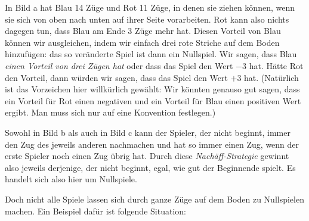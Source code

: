 \documentclass{zusammenfassung}
\begin{document}
\begin{aufgabe}
\begin{center}
  \end{center}
\end{aufgabe}

In Bild a hat Blau 14 Züge und Rot 11 Züge, in denen sie ziehen können, wenn sie sich von oben nach unten auf ihrer Seite
vorarbeiten. Rot kann also nichts dagegen tun, dass Blau am Ende 3 Züge mehr hat. Diesen Vorteil von Blau können wir ausgleichen,
indem wir einfach drei rote Striche auf dem Boden hinzufügen: das so veränderte Spiel ist dann ein Nullspiel. Wir sagen, dass Blau
\emph{einen Vorteil von drei Zügen hat} oder dass das Spiel den Wert $-3$ hat. Hätte Rot den Vorteil, dann würden wir sagen, dass
das Spiel den Wert $+3$ hat. (Natürlich ist das Vorzeichen hier willkürlich gewählt: Wir könnten genauso gut sagen, dass ein
Vorteil für Rot einen negativen und ein Vorteil für Blau einen positiven Wert ergibt. Man muss sich nur auf eine Konvention
festlegen.)

Sowohl in Bild b als auch in Bild c kann der Spieler, der nicht beginnt, immer den Zug des jeweils anderen nachmachen und hat so
immer einen Zug, wenn der erste Spieler noch einen Zug übrig hat. Durch diese \emph{Nachäff-Strategie} gewinnt also jeweils
derjenige, der nicht beginnt, egal, wie gut der Beginnende spielt. Es handelt sich also hier um Nullspiele.

Doch nicht alle Spiele lassen sich durch ganze Züge auf dem Boden zu Nullspielen machen. Ein Beispiel dafür ist folgende
Situation:
\end{document}
